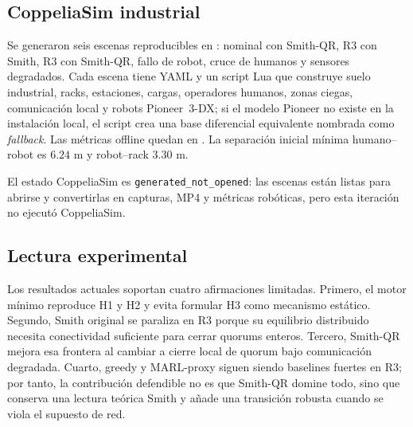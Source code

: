 \subsection{CoppeliaSim industrial}

Se generaron seis escenas reproducibles en : nominal con
Smith-QR, R3 con Smith, R3 con Smith-QR, fallo de robot, cruce de humanos y sensores
degradados. Cada escena tiene YAML y un script Lua que construye suelo industrial,
racks, estaciones, cargas, operadores humanos, zonas ciegas, comunicación local y robots
Pioneer~3-DX; si el modelo Pioneer no existe en la instalación local, el script crea una
base diferencial equivalente nombrada como \emph{fallback}. Las métricas offline quedan
en . La separación inicial mínima
humano--robot es $6.24$ m y robot--rack $3.30$ m.

El estado CoppeliaSim es \texttt{generated\_not\_opened}: las escenas están listas para
abrirse y convertirlas en capturas, MP4 y métricas robóticas, pero esta iteración no
ejecutó CoppeliaSim.

\subsection{Lectura experimental}

Los resultados actuales soportan cuatro afirmaciones limitadas. Primero, el motor mínimo
reproduce H1 y H2 y evita formular H3 como mecanismo estático. Segundo, Smith original se
paraliza en R3 porque su equilibrio distribuido necesita conectividad suficiente para
cerrar quorums enteros. Tercero, Smith-QR mejora esa frontera al cambiar a cierre local
de quorum bajo comunicación degradada. Cuarto, greedy y MARL-proxy siguen siendo
baselines fuertes en R3; por tanto, la contribución defendible no es que Smith-QR domine
todo, sino que conserva una lectura teórica Smith y añade una transición robusta cuando
se viola el supuesto de red.
